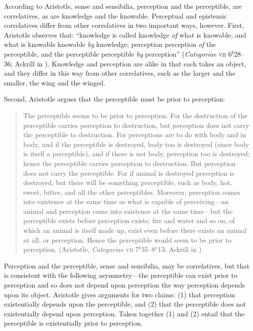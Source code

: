 According to Aristotle, sense and sensibilia, perception and the perceptible, are correlatives, as are knowledge and the knowable. Perceptual and epistemic correlatives differ from other correlatives in two important ways, however. First, Aristotle observes that: ``knowledge is called knowledge \emph{of} what is knowable, and what is knowable knowable \emph{by} knowledge; perception perception \emph{of} the perceptible, and the perceptible perceptible \emph{by} perception'' (\emph{Categoriae} \textsc{vii} 6\( ^{b} \)28--36; Ackrill in \citealt[11--12]{Barnes:1984uq}). Knowledge and perception are alike in that each takes an object, and they differ in this way from other correlatives, such as the larger and the smaller, the wing and the winged. 

Second, Aristotle argues that the perceptible must be prior to perception:
\begin{quote}
    The perceptible seems to be prior to perception. For the destruction of the perceptible carries perception to destruction, but perception does not carry the perceptible to destruction. For perceptions are to do with body and in body, and if the perceptible is destroyed, body too is destroyed (since body is itself a perceptible), and if there is not body, perception too is destroyed; hence the perceptible carries perception to destruction. But perception does not carry the perceptible. For if animal is destroyed perception is destroyed, but there will be something perceptible, such as body, hot, sweet, bitter, and all the other perceptibles. Moreover, perception comes into existence at the same time as what is capable of perceiving---an animal and perception come into existence at the same time---but the perceptible exists before perception exists; fire and water and so on, of which an animal is itself made up, exist even before there exists an animal at all, or perception. Hence the perceptible would seem to be prior to perception. (Aristotle, \emph{Categoriae} \textsc{vii} 7\( ^{b} \)35--8\( ^{a} \)13; Ackrill in \citealt[13--14]{Barnes:1984uq})
\end{quote}
Perception and the perceptible, sense and sensibilia, may be correlatives, but that is consistent with the following asymmetry---the perceptible can exist prior to perception and so does not depend upon perception the way perception depends upon its object. Aristotle gives arguments for two claims: (1) that perception existentially depends upon the perceptible, and (2) that the perceptible does not existentially depend upon perception. Taken together (1) and (2) entail that the perceptible is existentially prior to perception.

